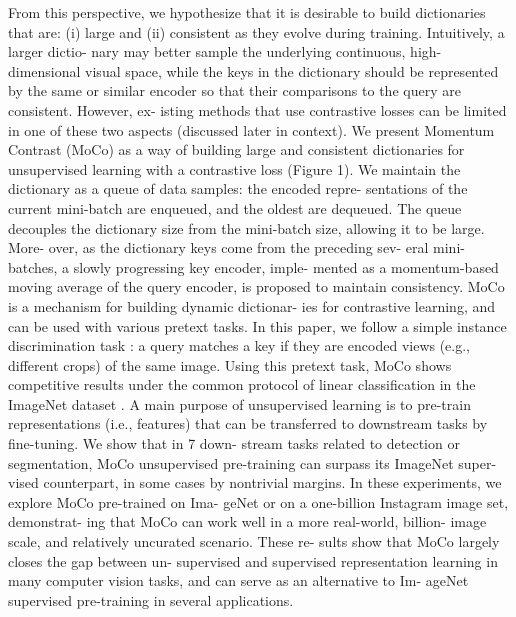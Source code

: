 \documentclass[10pt,twocolumn]{article}  %
\newcommand{\mylinebreak}{\linebreak\hspace*{1em}}
\begin{document}
From this perspective, we hypothesize that it is desirable
to build dictionaries that are: (i) large and (ii) consistent
as they evolve during training. Intuitively, a larger dictio-
nary may better sample the underlying continuous, high-
dimensional visual space, while the keys in the dictionary
should be represented by the same or similar encoder so that
their comparisons to the query are consistent. However, ex-
isting methods that use contrastive losses can be limited in
one of these two aspects (discussed later in context).
\mylinebreak We present Momentum Contrast (MoCo) as a way of
building large and consistent dictionaries for unsupervised
learning with a contrastive loss (Figure 1). We maintain the
dictionary as a queue of data samples: the encoded repre-
sentations of the current mini-batch are enqueued, and the
oldest are dequeued. The queue decouples the dictionary
size from the mini-batch size, allowing it to be large. More-
over, as the dictionary keys come from the preceding sev-
eral mini-batches, a slowly progressing key encoder, imple-
mented as a momentum-based moving average of the query
encoder, is proposed to maintain consistency.
MoCo is a mechanism for building dynamic dictionar-
ies for contrastive learning, and can be used with various
pretext tasks. In this paper, we follow a simple instance
discrimination task \cite{61_wu2018unsupervised, 63_ye2019unsupervised, 2_bachman2019learning}:
a query matches a key if
they are encoded views (e.g., different crops) of the same
image. Using this pretext task, MoCo shows competitive
results under the common protocol of linear classiﬁcation
in the ImageNet dataset \cite{11_deng2009imagenet}.
A main purpose of unsupervised learning is to pre-train
representations (i.e., features) that can be transferred to
downstream tasks by ﬁne-tuning. We show that in 7 down-
stream tasks related to detection or segmentation, MoCo
unsupervised pre-training can surpass its ImageNet super-
vised counterpart, in some cases by nontrivial margins. In
these experiments, we explore MoCo pre-trained on Ima-
geNet or on a one-billion Instagram image set, demonstrat-
ing that MoCo can work well in a more real-world, billion-
image scale, and relatively uncurated scenario. These re-
sults show that MoCo largely closes the gap between un-
supervised and supervised representation learning in many
computer vision tasks, and can serve as an alternative to Im-
ageNet supervised pre-training in several applications.
\end{document}
